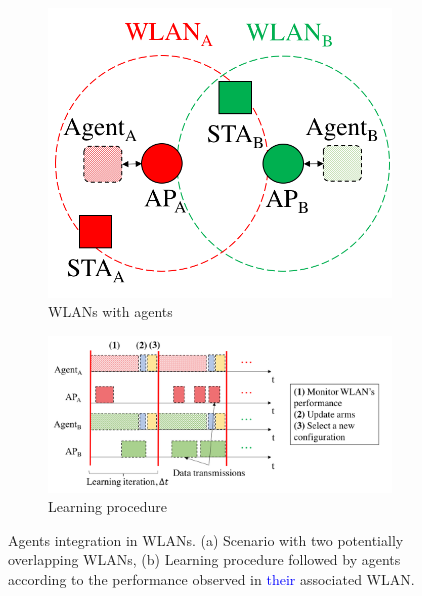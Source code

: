 \documentclass[preprint,12pt]{elsarticle}
\begin{document}
\begin{figure}[h!]
	\centering		
	\begin{subfigure}[b]{0.35\textwidth}
		\includegraphics[width=\textwidth]{agents_a}
		\caption{WLANs with agents}\label{fig:agents_a}
	\end{subfigure}
	\begin{subfigure}[b]{0.6\textwidth}
		\includegraphics[width=\textwidth]{agents_b}
		\caption{Learning procedure}\label{fig:agents_b}
	\end{subfigure}
	\caption{Agents integration in WLANs. (a) Scenario with two potentially overlapping WLANs, (b) Learning procedure followed by agents according to the performance observed in \textcolor{blue}{their} associated WLAN.}
	\label{fig:agents}
\end{figure}
\end{document}
